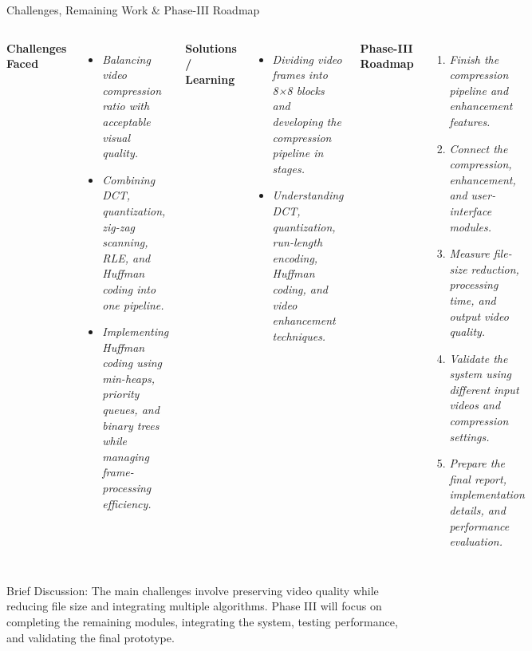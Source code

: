 \documentclass[aspectratio=169,11pt]{beamer}
\newcommand{\smallnote}[1]{%
\vspace{0.08cm}
{\scriptsize\color{GEUGrey}#1}
}
\newcommand{\placeholder}[1]{%
\textit{\color{GEUGrey}#1}
}
\begin{document}
\begin{frame}{Challenges, Remaining Work \& Phase-III Roadmap}
\scriptsize

\begin{columns}[T,totalwidth=\textwidth]


\textbf{\color{GEUBlue}Challenges Faced}

\begin{itemize}\itemsep-2pt
\item \placeholder{Balancing video compression ratio with acceptable visual quality.}
\item \placeholder{Combining DCT, quantization, zig-zag scanning, RLE, and Huffman coding into one pipeline.}
\item \placeholder{Implementing Huffman coding using min-heaps, priority queues, and binary trees while managing frame-processing efficiency.}
\end{itemize}

\vspace{-1mm}

\textbf{\color{GEUBlue}Solutions / Learning}

\begin{itemize}\itemsep-2pt
\item \placeholder{Dividing video frames into 8×8 blocks and developing the compression pipeline in stages.}
\item \placeholder{Understanding DCT, quantization, run-length encoding, Huffman coding, and video enhancement techniques.}
\end{itemize}


\textbf{\color{GEUBlue}Phase-III Roadmap}

\begin{enumerate}\itemsep-2pt
\item \placeholder{Finish the compression pipeline and enhancement features.}
\item \placeholder{Connect the compression, enhancement, and user-interface modules.}
\item \placeholder{Measure file-size reduction, processing time, and output video quality.}
\item \placeholder{Validate the system using different input videos and compression settings.}
\item \placeholder{Prepare the final report, implementation details, and performance evaluation.}
\end{enumerate}

\end{columns}

\smallnote{
Brief Discussion: The main challenges involve preserving video quality while reducing file size and integrating multiple algorithms. Phase III will focus on completing the remaining modules, integrating the system, testing performance, and validating the final prototype.}

\end{frame}
\end{document}
